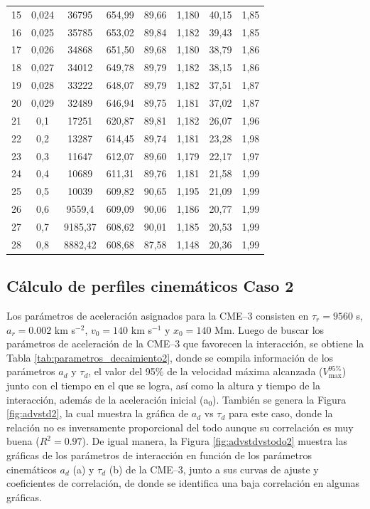 \begin{table}[h]
\begin{threeparttable}
\begin{tabular}{@{}c c c c c c c c@{}}
            15 & 0,024 & 36795 & 654,99 & 89,66 & 1,180 & 40,15 & 1,85\\
            16 & 0,025 & 35785 & 653,02 & 89,84 & 1,182 & 39,43 & 1,85\\
            17 & 0,026 & 34868 & 651,50 & 89,68 & 1,180 & 38,79 & 1,86\\
            18 & 0,027 & 34012 & 649,78 & 89,79 & 1,182 & 38,15 & 1,86\\
            19 & 0,028 & 33222 & 648,07 & 89,79 & 1,182 & 37,51 & 1,87\\
            20 & 0,029 & 32489 & 646,94 & 89,75 & 1,181 & 37,02 & 1,87\\
            21 & 0,1 & 17251 & 620,87 & 89,81 & 1,182 & 26,07 & 1,96 \\
            22 & 0,2 & 13287 & 614,45 & 89,74 & 1,181 & 23,28 & 1,98 \\
            23 & 0,3 & 11647 & 612,07 & 89,60 & 1,179 & 22,17 & 1,97 \\
            24 & 0,4 & 10689 & 611,31 & 89,76 & 1,181 & 21,58 & 1,99 \\
            25 & 0,5 & 10039 & 609,82 & 90,65 & 1,195 & 21,09 & 1,99 \\
            26 & 0,6 & 9559,4 & 609,09 & 90,06 & 1,186 & 20,77 & 1,99 \\
            27 & 0,7 & 9185,37 & 608,62 & 90,01 & 1,185 & 20,53 & 1,99 \\
            28 & 0,8 & 8882,42 & 608,68 & 87,58 & 1,148 & 20,36 & 1,99 \\
            \bottomrule
        \end{tabular}
    \end{threeparttable}
\end{table}

\subsection{Cálculo de perfiles cinemáticos Caso 2}
Los parámetros de aceleración asignados para la CME--3 consisten en $\tau_r=9560$ s, $a_r=0.002$ km s$^{-2}$, $v_0=140$ km s$^{-1}$ y $x_0=140$ Mm. Luego de buscar los parámetros de aceleración de la CME--3 que favorecen la interacción, se obtiene la Tabla \ref{tab:parametros_decaimiento2}, donde se compila información de los parámetros $a_d$ y $\tau_d$, el valor del 95$\%$ de la velocidad máxima alcanzada ($V_{\text{max}}^{95\%}$) junto con el tiempo en el que se logra, así como la altura y tiempo de la interacción, además de la aceleración inicial (a$_0$). También se genera la Figura \ref{fig:advstd2}, la cual muestra la gráfica de $a_d$ vs $\tau_d$ para este caso, donde la relación no es inversamente proporcional del todo aunque su correlación es muy buena ($R^{2}=0.97$). De igual manera, la Figura \ref{fig:advstdvstodo2} muestra las gráficas de los parámetros de interacción en función de los parámetros cinemáticos $a_d$ (a) y $\tau_d$ (b) de la CME--3, junto a sus curvas de ajuste y coeficientes de correlación, de donde se identifica una baja correlación en algunas gráficas.

